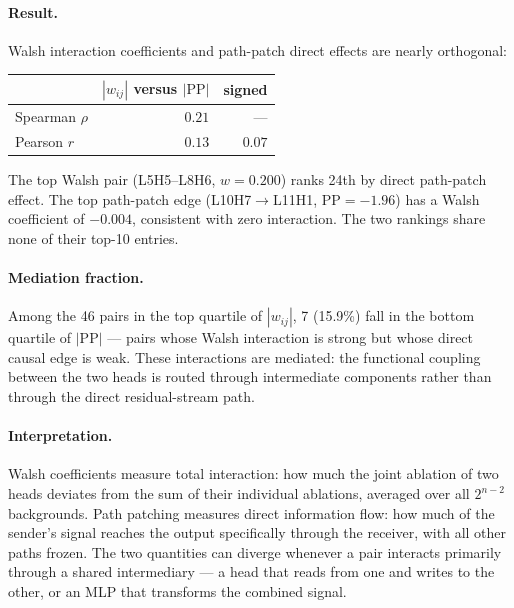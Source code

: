 \documentclass{article}
\begin{document}
\paragraph{Result.}

Walsh interaction coefficients and path-patch direct effects are nearly
orthogonal:

\medskip

\begin{tabular}{lrr}
\toprule
 & $|w_{ij}|$ versus $|\text{PP}|$ & signed \\
\midrule
Spearman $\rho$  & $0.21$ & --- \\
Pearson $r$      & $0.13$ & $0.07$ \\
\bottomrule
\end{tabular}

\medskip

The top Walsh pair (L5H5--L8H6, $w = 0.200$) ranks 24th by direct
path-patch effect. The top path-patch edge (L10H7$\to$L11H1,
$\text{PP} = -1.96$) has a Walsh coefficient of $-0.004$, consistent
with zero interaction. The two rankings share none of their top-10 entries.

\paragraph{Mediation fraction.}

Among the 46 pairs in the top quartile of $|w_{ij}|$, 7 (15.9\%) fall
in the bottom quartile of $|\text{PP}|$ --- pairs whose Walsh interaction
is strong but whose direct causal edge is weak. These interactions are
mediated: the functional coupling between the two heads is routed through
intermediate components rather than through the direct residual-stream
path.

\paragraph{Interpretation.}

Walsh coefficients measure total interaction: how much the joint
ablation of two heads deviates from the sum of their individual
ablations, averaged over all $2^{n-2}$ backgrounds. Path patching
measures direct information flow: how much of the sender's signal
reaches the output specifically through the receiver, with all other
paths frozen. The two quantities can diverge whenever a pair interacts
primarily through a shared intermediary --- a head that reads from one
and writes to the other, or an MLP that transforms the combined signal.
\end{document}
